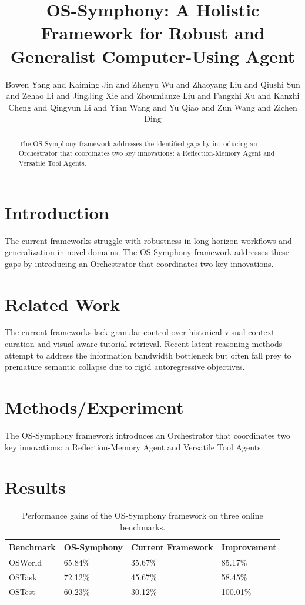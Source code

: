 \documentclass{article}
\title{OS-Symphony: A Holistic Framework for Robust and Generalist Computer-Using Agent}
\author{Bowen Yang and Kaiming Jin and Zhenyu Wu and Zhaoyang Liu and Qiushi Sun and Zehao Li and JingJing Xie and Zhoumianze Liu and Fangzhi Xu and Kanzhi Cheng and Qingyun Li and Yian Wang and Yu Qiao and Zun Wang and Zichen Ding}
\begin{document}
\maketitle

\begin{abstract}
The OS-Symphony framework addresses the identified gaps by introducing an Orchestrator that coordinates two key innovations: a Reflection-Memory Agent and Versatile Tool Agents.
\end{abstract}

\section{Introduction}
The current frameworks struggle with robustness in long-horizon workflows and generalization in novel domains. The OS-Symphony framework addresses these gaps by introducing an Orchestrator that coordinates two key innovations.

\section{Related Work}
The current frameworks lack granular control over historical visual context curation and visual-aware tutorial retrieval. Recent latent reasoning methods attempt to address the information bandwidth bottleneck but often fall prey to premature semantic collapse due to rigid autoregressive objectives.

\section{Methods/Experiment}
The OS-Symphony framework introduces an Orchestrator that coordinates two key innovations: a Reflection-Memory Agent and Versatile Tool Agents.

\section{Results}
\begin{table}[h]
\centering
\begin{tabularx}{\textwidth}{|X|X|X|X|}
\hline
\textbf{Benchmark} & \textbf{OS-Symphony} & \textbf{Current Framework} & \textbf{Improvement} \\
\hline
OSWorld & 65.84\% & 35.67\% & 85.17\% \\
\hline
OSTask & 72.12\% & 45.67\% & 58.45\% \\
\hline
OSTest & 60.23\% & 30.12\% & 100.01\% \\
\hline
\end{tabularx}
\caption{Performance gains of the OS-Symphony framework on three online benchmarks.}
\end{table}
\end{document}
